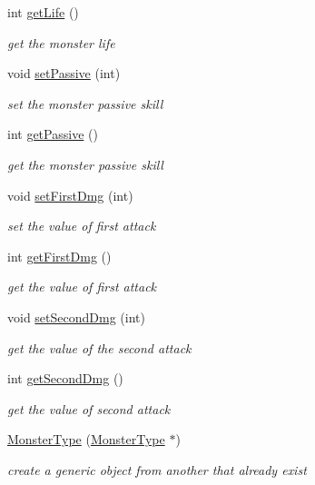\begin{DoxyCompactItemize}
int \hyperlink{classMonsterType_a2c6d0cf9b9a19dde92631b66cb08d1cb}{get\+Life} ()
\begin{DoxyCompactList}\small\item\em get the monster life \end{DoxyCompactList}\item 
void \hyperlink{classMonsterType_a25655a5a86353b7706e9646c3a50cee6}{set\+Passive} (int)
\begin{DoxyCompactList}\small\item\em set the monster passive skill \end{DoxyCompactList}\item 
int \hyperlink{classMonsterType_a461a33170a4825886d642a044ea93889}{get\+Passive} ()
\begin{DoxyCompactList}\small\item\em get the monster passive skill \end{DoxyCompactList}\item 
void \hyperlink{classMonsterType_ad205804ddd69cc502d59cbc23ca4c1b2}{set\+First\+Dmg} (int)
\begin{DoxyCompactList}\small\item\em set the value of first attack \end{DoxyCompactList}\item 
int \hyperlink{classMonsterType_aed496b64b41b963318e3b26f3fc2c3ff}{get\+First\+Dmg} ()
\begin{DoxyCompactList}\small\item\em get the value of first attack \end{DoxyCompactList}\item 
void \hyperlink{classMonsterType_a09822bb5473dbc10acd4902626467594}{set\+Second\+Dmg} (int)
\begin{DoxyCompactList}\small\item\em get the value of the second attack \end{DoxyCompactList}\item 
int \hyperlink{classMonsterType_aa406a23936de02fdc41a7a093e75dbcb}{get\+Second\+Dmg} ()
\begin{DoxyCompactList}\small\item\em get the value of second attack \end{DoxyCompactList}\item 
\hyperlink{classMonsterType_ae00885d825040ff47e39261b29917020}{Monster\+Type} (\hyperlink{classMonsterType}{Monster\+Type} $\ast$)
\begin{DoxyCompactList}\small\item\em create a generic object from another that already exist \end{DoxyCompactList}\item 

\end{DoxyCompactItemize}
